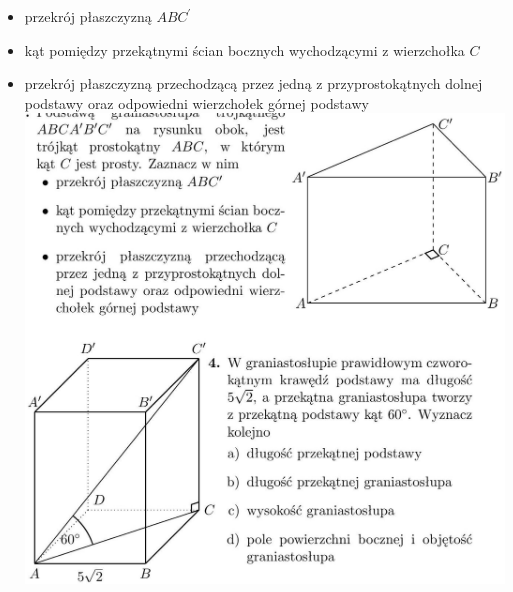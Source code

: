 \documentclass[10pt]{article}
\begin{document}
\begin{itemize}
  \item przekrój płaszczyzną \(A B C^{\prime}\)
  \item kąt pomiędzy przekątnymi ścian bocznych wychodzącymi z wierzchołka \(C\)
  \item przekrój płaszczyzną przechodzącą przez jedną z przyprostokątnych dolnej podstawy oraz odpowiedni wierzchołek górnej podstawy\\
\includegraphics[max width=\textwidth, center]{2024_11_21_e9b4faa005d5be2cc318g-078(1)}
\end{itemize}
\end{document}
